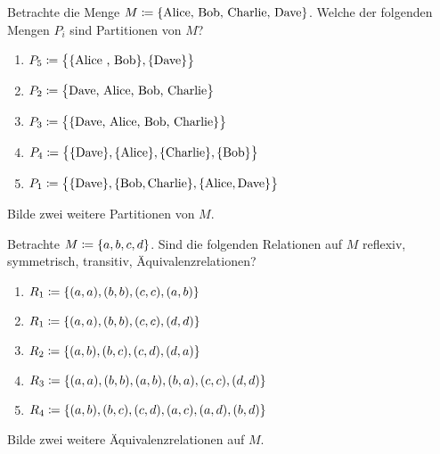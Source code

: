 \begin{aufg}

  Betrachte die Menge $M \coloneqq \{ \text{Alice, Bob, Charlie, Dave} \}$. Welche der
  folgenden Mengen $P_{i}$ sind Partitionen von $M$?
  \begin{enumerate}
    \item $P_{5}\coloneqq\big\{  \{ \text{Alice , Bob}  \} , \{ \text{Dave} \} \big\}$
    \item $P_{2}\coloneqq\big\{ \text{Dave, Alice, Bob, Charlie} \big\}$
    \item $P_{3}\coloneqq\big\{  \{ \text{Dave, Alice, Bob, Charlie} \} \big\}$
    \item $P_{4}\coloneqq\big\{  \{ \text{Dave} \} , \{ \text{Alice} \} , \{ \text{Charlie} \} , \{ \text{Bob} \} \big\}$
    \item $P_{1}\coloneqq\big\{  \{ \text{Dave} \} , \{ \text{Bob}, \text{Charlie} \} , \{ \text{Alice}, \text{Dave} \}  \big\}$
  \end{enumerate}
  Bilde zwei weitere Partitionen von $M$.
  
\end{aufg}


\begin{aufg}

  Betrachte $M \coloneqq \{ a, b, c, d\}$. Sind die folgenden Relationen auf $M$
  reflexiv, symmetrisch, transitiv, Äquivalenzrelationen?
  \begin{enumerate}
    \item $R_{1} \coloneqq \{ (a,a) , (b,b) , (c,c) , (a,b) \}$
    \item $R_{1} \coloneqq \{ (a,a) , (b,b) , (c,c) , (d,d) \}$
    \item $R_{2} \coloneqq \{ (a,b) , (b,c) , (c,d) , (d,a) \}$
    \item $R_{3} \coloneqq \{ (a,a) , (b,b) , (a,b) , (b,a) , (c,c) , (d,d)\}$
    \item $R_{4} \coloneqq \{ (a,b) , (b,c) , (c,d) , (a,c) , (a,d) , (b,d)\}$
  \end{enumerate}
  Bilde zwei weitere Äquivalenzrelationen auf $M$.
  
\end{aufg}


